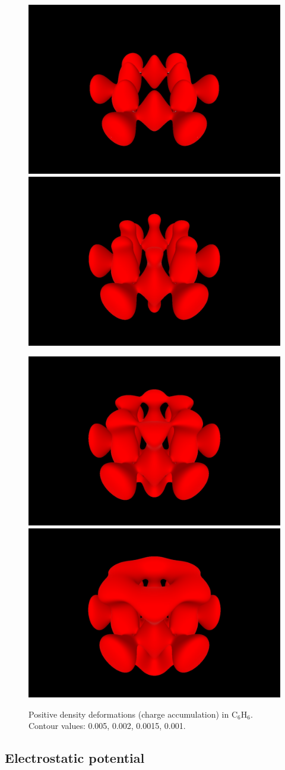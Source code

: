 \documentclass[10pt]{article}
\begin{document}
\vspace*{5mm}
\begin{figure}[H]
\begin{center}
\includegraphics[width=.4\linewidth]{C6H6-pVQZ-def-0p005.png}
\hspace*{5mm}
\includegraphics[width=.4\linewidth]{C6H6-pVQZ-def-0p002.png}

\includegraphics[width=.4\linewidth]{C6H6-pVQZ-def-0p0015.png}
\hspace*{5mm}
\includegraphics[width=.4\linewidth]{C6H6-pVQZ-def-0p001.png}
\end{center}
\caption[Charge accumulation in C$_6$H$_6$]{ Positive density deformations (charge accumulation) in C$_6$H$_6$.
Contour values: 0.005, 0.002, 0.0015, 0.001.
\label{fig:6_3_3}}
\end{figure}


\subsection{Electrostatic potential \label{sec:6.4} }
\end{document}

